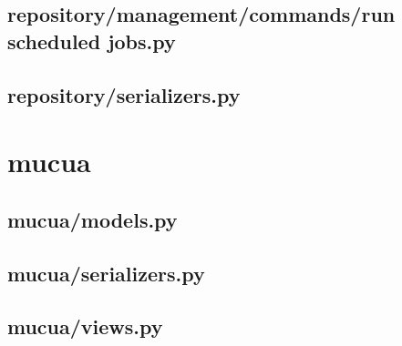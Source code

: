 \subsection{repository/management/commands/run scheduled jobs.py}


%

\subsection{repository/serializers.py}


\section{mucua}

\subsection{mucua/models.py}


\subsection{mucua/serializers.py}


\subsection{mucua/views.py}



%


